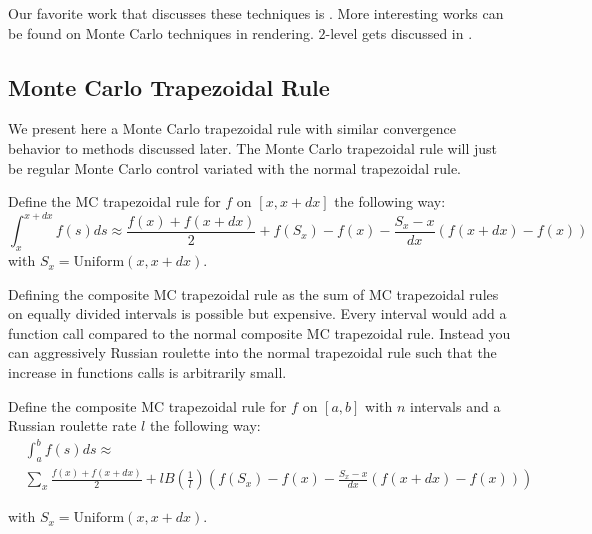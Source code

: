 \documentclass[a4paper,12pt]{article}
\begin{document}
\vspace*{0.2cm}
\begin{pythonn}
\end{pythonn}

\begin{related}
    Our favorite work that discusses these techniques is \cite{veach_robust_nodate}.
    More interesting works can be found on Monte Carlo techniques in rendering.
    $2$-level gets discussed in \cite{giles_multilevel_2013}.
\end{related}

\subsection{Monte Carlo Trapezoidal Rule}
We present here a Monte Carlo trapezoidal rule with similar convergence behavior to
methods discussed later. The Monte Carlo trapezoidal rule will just be
regular Monte Carlo control variated with the normal trapezoidal rule.

\begin{definition}
    Define the MC trapezoidal rule for $f$ on $[x,x+dx]$ the following
    way:
    \begin{equation}
        \int_{x}^{x+dx} f(s)ds \approx
        \frac{f(x)+f(x+dx)}{2} + f(S_{x})-f(x)-\frac{S_{x}-x}{dx}(f(x+dx)-f(x))
    \end{equation}
    with $S_{x} = \text{Uniform}(x,x+dx)$.
\end{definition}


Defining the composite MC trapezoidal rule as
the sum of MC trapezoidal rules on equally divided intervals
is possible but expensive. Every interval would add a function call
compared to the normal composite MC trapezoidal rule. Instead
you can aggressively Russian roulette into the normal trapezoidal rule
such that the increase in functions calls is arbitrarily small.

\begin{definition} \label{MCtrap}
    Define the composite MC trapezoidal rule for $f$ on $[a,b]$ with
    $n$ intervals and a Russian roulette rate $l$ the following way:
    \begin{align}
         & \int_{a}^{b} f(s)ds \approx        \\
         & \sum_{x}  \frac{f(x)+f(x+dx)}{2} +
        l B \left(\frac{1}{l} \right)
        \left(f(S_{x})-f(x)-\frac{S_{x}-x}{dx}(f(x+dx)-f(x)) \right)
    \end{align}

    with $S_{x} = \text{Uniform}(x,x+dx)$.

\end{definition}
\end{document}
